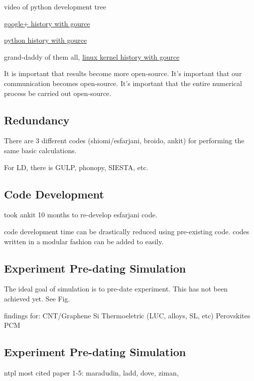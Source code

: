 \documentclass[letterpaper,12pt,amsmath,amssymb]{article}
\begin{document}
video of python development tree

\href{http://www.youtube.com/watch?v=3poNeQHUKrs}
{google+ history with gource}

\href{http://www.youtube.com/watch?v=cNBtDstOTmA}
{python history with gource}

grand-daddy of them all, 
\href{http://www.youtube.com/watch?v=pOSqctHH9vY}
{linux kernel history with gource}

It is important that results become more open-source.  It's important 
that our communication becomes open-source. It's important that the 
entire numerical process be carried out open-source. 

\subsection{Redundancy}

There are 3 different codes (shiomi/esfarjani, broido, ankit) for 
performing the same basic calculations.

For LD, there is GULP, phonopy, SIESTA, etc.

\subsection{Code Development}

took ankit 10 months to re-develop esfarjani code.  

code development time can be drastically reduced using pre-existing code. 
codes written in a modular fashion can be added to easily.

\subsection{Experiment Pre-dating Simulation}
The ideal goal of simulation is to pre-date experiment.  This has not 
been achieved yet.  See Fig.

findings for:
CNT/Graphene
Si
Thermoeletric (LUC, alloys, SL, etc)
Perovskites
PCM

\subsection{Experiment Pre-dating Simulation}

ntpl most cited paper 1-5:
maradudin, ladd, dove, ziman, 






\clearpage
{}


\end{document}
